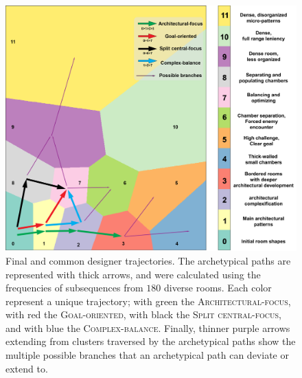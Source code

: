 \begin{figure}[t!]
\centerline{\includegraphics[width=\textwidth]{figures/figure4.png}}
\caption{Final and common designer trajectories. The archetypical paths are represented with thick arrows, and were calculated using the frequencies of subsequences from $180$ diverse rooms. Each color represent a unique trajectory; with green the \textsc{Architectural-focus}, with red the \textsc{Goal-oriented}, with black the \textsc{Split central-focus}, and with blue the \textsc{Complex-balance}. Finally, thinner purple arrows extending from clusters traversed by the archetypical paths show the multiple possible branches that an archetypical path can deviate or extend to.} \label{fig:finalPaths}
\end{figure}



